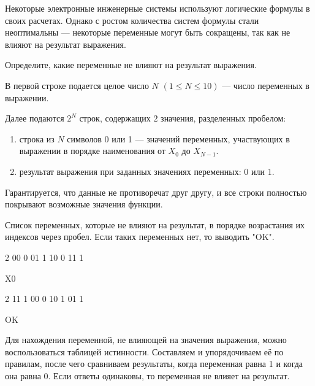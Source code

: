 
Некоторые электронные инженерные системы используют логические формулы в своих расчетах. Однако с ростом количества систем формулы стали неоптимальны — некоторые переменные могут быть сокращены, так как не влияют на результат выражения.

Определите, какие переменные не влияют на результат выражения.


В первой строке подается целое число $N$ $(1 \leq N \leq 10)$ — число переменных в выражении.

Далее подаются $2^N$ строк, содержащих $2$ значения, разделенных пробелом:
\begin{enumerate}
    \item строка из $N$ символов 0 или 1 — значений переменных, участвующих в выражении в порядке наименования от $X_0$ до $X_{N-1}$.
    \item результат выражения при заданных значениях переменных: $0$ или $1$.
\end{enumerate}

Гарантируется, что данные не противоречат друг другу, и все строки полностью покрывают возможные значения функции.

\outputfmtSection

Список переменных, которые не влияют на результат, в порядке возрастания их индексов через пробел. Если таких переменных нет, то выводить "OK".


\begin{myverbbox}[\small]{\vinput}
    2
    00 0
    01 1
    10 0
    11 1
\end{myverbbox}
\begin{myverbbox}[\small]{\voutput}
    X0
\end{myverbbox}


\begin{myverbbox}[\small]{\vinput}
    2
    11 1
    00 0
    10 1
    01 1
\end{myverbbox}
\begin{myverbbox}[\small]{\voutput}
    OK
\end{myverbbox}

\solutionSection

Для нахождения переменной, не влияющей на значения выражения, можно воспользоваться таблицей истинности. Составляем и упорядочиваем её по правилам, после чего сравниваем результаты, когда переменная равна 1 и когда она равна 0. Если ответы одинаковы, то переменная не влияет на результат.

